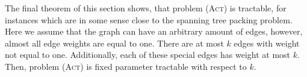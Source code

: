 \documentclass[runningheads]{llncs}
\numberwithin{equation}{section}
\newcommand{\N}{\mathbb{N}}
\newcommand{\set}[1]{\{ #1 \}}
\newcommand{\fromto}[2]{\set{#1, \ldots, #2}}
\newcommand{\bigO}{\mathcal{O}}
\newcommand{\act}{\textsc{(Act)}}
\newcommand{\stact}{\textsc{(stAct)}}
\newcommand{\True}{\textsc{True}}
\begin{document}
%
%
%

The final theorem of this section shows, that problem {\act} is tractable, for instances which are in some sense close to the spanning tree packing problem. Here we assume that the graph can have an arbitrary amount of edges, however, almost all edge weights are equal to one. There are at most $k$ edges with weight not equal to one. Additionally, each of these special edges has weight at most $k$. Then, problem {\act} is fixed parameter tractable with respect to $k$.
\end{document}

